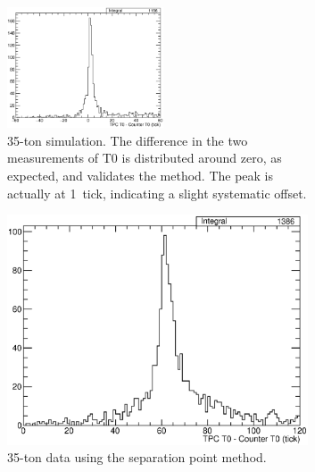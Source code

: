 \begin{figure}
  \centering
  \begin{subfigure}[t]{\linewidth}
    \centering
    \includegraphics[width=0.51\textwidth]{TPCCounterT0DifferenceMC.eps}
    \caption{35-ton simulation.  The difference in the two measurements of T0 is distributed around zero, as expected, and validates the method.  The peak is actually at 1~tick, indicating a slight systematic offset.}
    \label{fig:TPCCounterT0DifferenceMC}
  \end{subfigure}
  \vfill
  \begin{subfigure}[t]{0.48\linewidth}
    \centering
    \includegraphics[width=0.98\textwidth]{TPCCounterT0DifferenceData.eps}
    \caption{35-ton data using the separation point method.}
    \label{fig:TPCCounterT0DifferenceData}
  \end{subfigure}
  \hfill
  \begin{subfigure}[t]{0.48\linewidth}
    \centering

\end{subfigure}
\end{figure}
